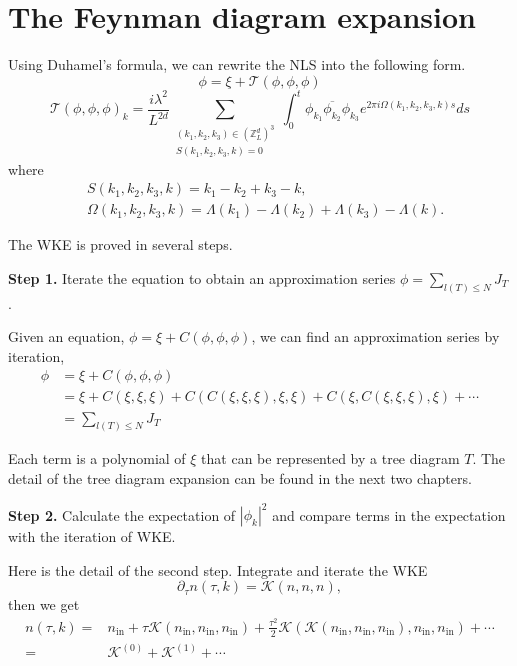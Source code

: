 \section{The Feynman diagram expansion}
Using Duhamel's formula, we can rewrite the NLS into the following form.
\begin{equation}
    \phi = \xi + \mathcal{T}(\phi,\phi,\phi)
\end{equation}
\begin{equation}
    \mathcal{T}(\phi,\phi,\phi)_k = \frac{i\lambda^2}{L^{2d}} \sum\limits_{\substack{(k_1,k_2,k_3) \in (\mathbb{Z}^d_L)^3 \\ S(k_1,k_2,k_3,k) = 0}}\int_{0}^{t} \phi_{k_1} \overline{\phi_{k_2}} \phi_{k_3}e^{2\pi i \Omega(k_1,k_2,k_3,k)s} ds
\end{equation}
where
\begin{equation}
\begin{split}
    &S(k_1,k_2,k_3,k) = k_1 - k_2 + k_3 - k,
    \\
    &\Omega(k_1,k_2,k_3,k) =\Lambda(k_1)-\Lambda(k_2)+\Lambda(k_3)-\Lambda(k).
\end{split}
\end{equation}

The WKE is proved in several steps.

\textbf{Step 1.} Iterate the equation to obtain an approximation series $\phi = \sum_{l(T)\le N} J_{T}$.

Given an equation, $\phi= \xi + C(\phi,\phi,\phi)$, we can find an approximation series by iteration,
\begin{equation}\label{eq.treeintro}
    \begin{split}
        \phi&= \xi + C(\phi,\phi,\phi) 
        \\
        &=\xi + C(\xi,\xi,\xi) + C(C(\xi,\xi,\xi),\xi,\xi) + C(\xi,C(\xi,\xi,\xi),\xi)+\cdots
        \\
        &= \sum_{l(T)\le N} J_{T}
    \end{split}
\end{equation}

Each term is a polynomial of $\xi$ that can be represented by a tree diagram $T$. The detail of the tree diagram expansion can be found in the next two chapters.

\textbf{Step 2.} Calculate the expectation of $|\phi_k|^2$ and compare terms in the expectation with the iteration of WKE.



Here is the detail of the second step. Integrate and iterate the WKE 
\begin{equation}
    \partial_\tau n(\tau, k) =\mathcal K\left(n, n, n\right),
\end{equation}
then we get
\begin{equation}
\begin{split}
    n(\tau, k) =& n_{\text{in}} + \tau\mathcal K(n_{\text{in}}, n_{\text{in}}, n_{\text{in}}) + \frac{\tau^2}{2}\mathcal K(\mathcal K(n_{\text{in}}, n_{\text{in}}, n_{\text{in}}), n_{\text{in}}, n_{\text{in}}) + \cdots
    \\
    =& \mathcal K^{(0)} + \mathcal K^{(1)} + \cdots 
\end{split}
\end{equation}

